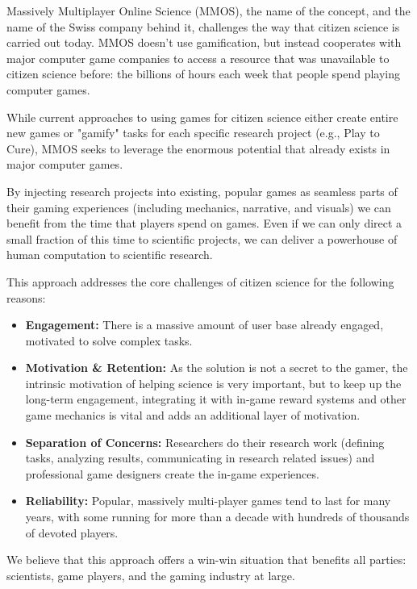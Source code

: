 	Massively Multiplayer Online Science (MMOS), the name of the concept, and the name of the Swiss company behind it, challenges the way that citizen science is carried out today. MMOS doesn't use gamification, but instead cooperates with major computer game companies to access a resource that was unavailable to citizen science before: the billions of hours each week that people spend playing computer games.

	While current approaches to using games for citizen science either create entire new games or "gamify" tasks for each specific research project (e.g., Play to Cure), MMOS seeks to leverage the enormous potential that already exists in major computer games. 

	By injecting research projects into existing, popular games as seamless parts of their gaming experiences (including mechanics, narrative, and visuals) we can benefit from the time that players spend on games. Even if we can only direct a small fraction of this time to scientific projects, we can deliver a powerhouse of human computation to scientific research.

	This approach addresses the core challenges of citizen science for the following reasons:

	\begin{itemize}
	  \item {\bf Engagement:} There is a massive amount of user base already engaged, motivated to solve complex tasks.
	  \item {\bf Motivation \& Retention:} As the solution is not a secret to the gamer, the intrinsic motivation of helping science is very important, but to keep up the long-term engagement, integrating it with in-game reward systems and other game mechanics is vital and adds an additional layer of motivation.
	  \item {\bf Separation of Concerns:} Researchers do their research work (defining tasks, analyzing results, communicating in research related issues) and professional game designers create the in-game experiences.
	  \item {\bf Reliability:} Popular, massively multi-player games tend to last for many years, with some running for more than a decade with hundreds of thousands of devoted players.
	\end{itemize}

	We believe that this approach offers a win-win situation that benefits all parties: scientists, game players, and the gaming industry at large. 

